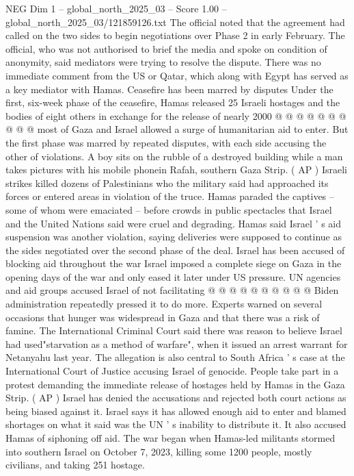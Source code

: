 \begin{textsample}{NEG Dim 1 – global\_north\_2025\_03 – Score 1.00 – global\_north\_2025\_03/121859126.txt}
The official noted that the agreement had called on the two sides to begin negotiations over Phase 2 in early February.
The official, who was not authorised to brief the media and spoke on condition of anonymity, said mediators were trying to resolve the dispute.
There was no immediate comment from the US or Qatar, which along with Egypt has served as a key mediator with Hamas.
Ceasefire has been marred by disputes Under the first, six-week phase of the ceasefire, Hamas released 25 Israeli hostages and the bodies of eight others in exchange for the release of nearly 2000 @ @ @ @ @ @ @ @ @ @ most of Gaza and Israel allowed a surge of humanitarian aid to enter.
But the first phase was marred by repeated disputes, with each side accusing the other of violations.
A boy sits on the rubble of a destroyed building while a man takes pictures with his mobile phonein Rafah, southern Gaza Strip. ( AP ) Israeli strikes killed dozens of Palestinians who the military said had approached its forces or entered areas in violation of the truce.
Hamas paraded the captives -- some of whom were emaciated -- before crowds in public spectacles that Israel and the United Nations said were cruel and degrading.
Hamas said Israel ' s aid suspension was another violation, saying deliveries were supposed to continue as the sides negotiated over the second phase of the deal.
Israel has been accused of blocking aid throughout the war Israel imposed a complete siege on Gaza in the opening days of the war and only eased it later under US pressure.
UN agencies and aid groups accused Israel of not facilitating @ @ @ @ @ @ @ @ @ @ Biden administration repeatedly pressed it to do more.
Experts warned on several occasions that hunger was widespread in Gaza and that there was a risk of famine.
The International Criminal Court said there was reason to believe Israel had used"starvation as a method of warfare", when it issued an arrest warrant for Netanyahu last year.
The allegation is also central to South Africa ' s case at the International Court of Justice accusing Israel of genocide.
People take part in a protest demanding the immediate release of hostages held by Hamas in the Gaza Strip. ( AP ) Israel has denied the accusations and rejected both court actions as being biased against it.
Israel says it has allowed enough aid to enter and blamed shortages on what it said was the UN ' s inability to distribute it.
It also accused Hamas of siphoning off aid.
The war began when Hamas-led militants stormed into southern Israel on October 7, 2023, killing some 1200 people, mostly civilians, and taking 251 hostage.

\end{textsample}
